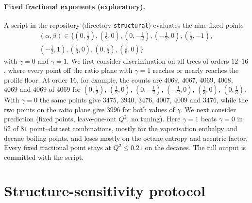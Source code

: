 \documentclass[a5paper, 10pt]{article}
\theoremstyle{plain}
\theoremstyle{remark}
\theoremstyle{definition}
\begin{document}
\paragraph{Fixed fractional exponents (exploratory).} A script in the
repository (directory \texttt{structural}) evaluates the nine fixed
points
\begin{multline*}
(\alpha,\beta) \in \bigl\{(0,\tfrac12), (\tfrac12,0), (0,-\tfrac12),
(-\tfrac12,0), (\tfrac12,-1),\\
(-\tfrac12,1), (\tfrac13,0), (0,\tfrac13), (\tfrac16,0)\bigr\}
\end{multline*}
with $\gamma = 0$ and $\gamma = 1$. We first consider discrimination on
all trees of orders $12$--$16$, where every point off the ratio plane
with $\gamma = 1$ reaches or nearly reaches the profile floor. At order
$16$, for example, the counts are $4069$, $4067$, $4069$, $4068$,
$4069$ and $4069$ of $4069$ for $(0,\tfrac12)$, $(\tfrac12,0)$,
$(0,-\tfrac12)$, $(-\tfrac12,0)$, $(\tfrac13,0)$, $(0,\tfrac13)$. With
$\gamma = 0$ the same points give $3475$, $3940$, $3476$, $4007$,
$4009$ and $3476$, while the two points on the ratio plane give $3996$
for both values of $\gamma$. We next consider prediction (fixed points,
leave-one-out $Q^2$, no tuning). Here $\gamma = 1$ beats $\gamma = 0$
in $52$ of $81$ point--dataset combinations, mostly for the
vaporisation enthalpy and decane boiling points, and loses mostly on
the octane entropy and acentric factor. Every fixed fractional point
stays at $Q^2 \le 0.21$ on the decanes. The full output is committed
with the script.

\section{Structure-sensitivity protocol}\label{sec:s-ss}
\end{document}
